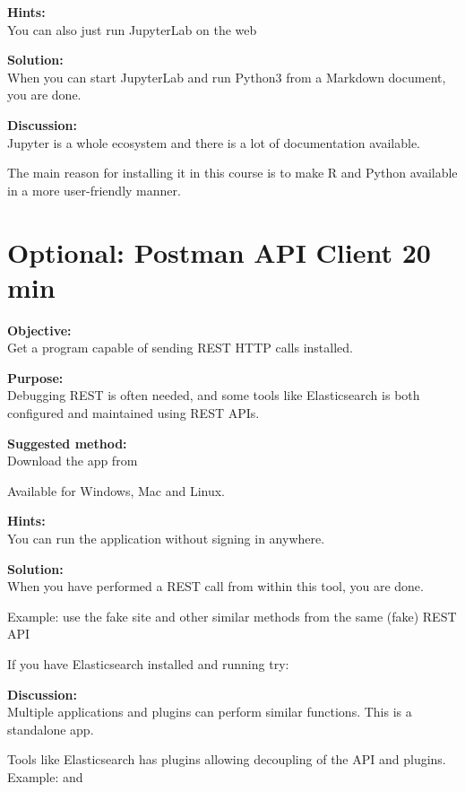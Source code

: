 \documentclass[a4paper,11pt,notitlepage]{report}
\begin{document}
{\bf Hints:}\\
You can also just run JupyterLab on the web \smiley

{\bf Solution:}\\
When you can start JupyterLab and run Python3 from a Markdown document, you are done.


{\bf Discussion:}\\
Jupyter is a whole ecosystem and there is a lot of documentation available.

The main reason for installing it in this course is to make R and Python available in a more user-friendly manner.




\chapter{Optional: Postman API Client 20 min}
\label{ex:postman-api}


{\bf Objective:}\\
Get a program capable of sending REST HTTP calls installed.


{\bf Purpose:}\\
Debugging REST is often needed, and some tools like Elasticsearch is both configured and maintained using REST APIs.

{\bf Suggested method:}\\
Download the app from

Available for Windows, Mac and Linux.

{\bf Hints:}\\
You can run the application without signing in anywhere.

{\bf Solution:}\\
When you have performed a REST call from within this tool, you are done.

Example: use the fake site  and other similar methods from the same (fake) REST API

If you have Elasticsearch installed and running try: 

{\bf Discussion:}\\
Multiple applications and plugins can perform similar functions. This is a standalone app.

Tools like Elasticsearch has plugins allowing decoupling of the API and plugins. Example:  and 
\end{document}
